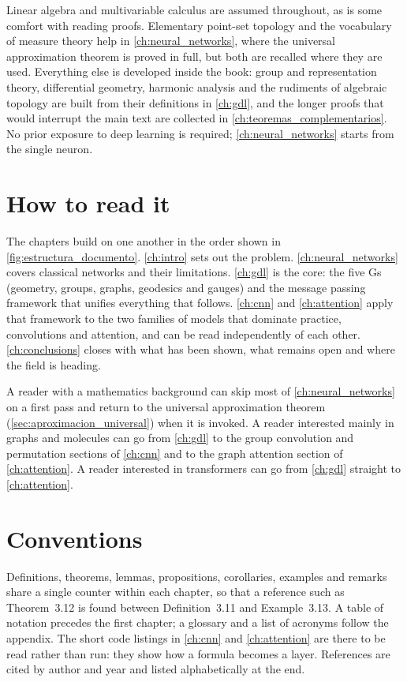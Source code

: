 Linear algebra and multivariable calculus are assumed throughout, as is some comfort with reading proofs. Elementary point-set topology and the vocabulary of measure theory help in \autoref{ch:neural_networks}, where the universal approximation theorem is proved in full, but both are recalled where they are used. Everything else is developed inside the book: group and representation theory, differential geometry, harmonic analysis and the rudiments of algebraic topology are built from their definitions in \autoref{ch:gdl}, and the longer proofs that would interrupt the main text are collected in \autoref{ch:teoremas_complementarios}. No prior exposure to deep learning is required; \autoref{ch:neural_networks} starts from the single neuron.

\section*{How to read it}

The chapters build on one another in the order shown in \autoref{fig:estructura_documento}. \autoref{ch:intro} sets out the problem. \autoref{ch:neural_networks} covers classical networks and their limitations. \autoref{ch:gdl} is the core: the five Gs (geometry, groups, graphs, geodesics and gauges) and the message passing framework that unifies everything that follows. \autoref{ch:cnn} and \autoref{ch:attention} apply that framework to the two families of models that dominate practice, convolutions and attention, and can be read independently of each other. \autoref{ch:conclusions} closes with what has been shown, what remains open and where the field is heading.

A reader with a mathematics background can skip most of \autoref{ch:neural_networks} on a first pass and return to the universal approximation theorem (\autoref{sec:aproximacion_universal}) when it is invoked. A reader interested mainly in graphs and molecules can go from \autoref{ch:gdl} to the group convolution and permutation sections of \autoref{ch:cnn} and to the graph attention section of \autoref{ch:attention}. A reader interested in transformers can go from \autoref{ch:gdl} straight to \autoref{ch:attention}.

\section*{Conventions}

Definitions, theorems, lemmas, propositions, corollaries, examples and remarks share a single counter within each chapter, so that a reference such as Theorem~3.12 is found between Definition~3.11 and Example~3.13. A table of notation precedes the first chapter; a glossary and a list of acronyms follow the appendix. The short code listings in \autoref{ch:cnn} and \autoref{ch:attention} are there to be read rather than run: they show how a formula becomes a layer. References are cited by author and year and listed alphabetically at the end.

